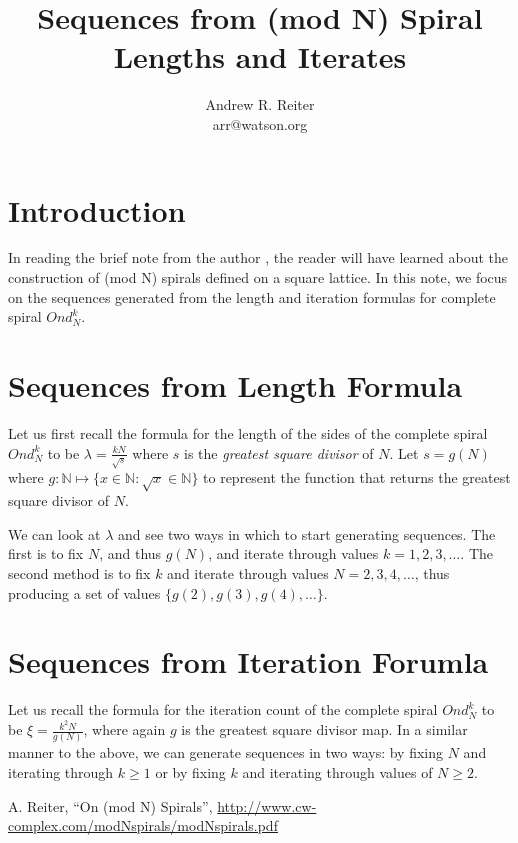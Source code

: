 \documentclass[11pt]{amsart}
\title{Sequences from (mod N) Spiral Lengths and Iterates}
\author{Andrew R. Reiter\\arr@watson.org}
\begin{document}
\maketitle

\section{Introduction}
In reading the brief note from the author \cite{ARRmodN}, the reader will have learned about the construction of (mod N) spirals defined on a square lattice. In this note, we focus on the sequences generated from the length and iteration formulas for complete spiral $Ond^k_N$.

\section{Sequences from Length Formula}
Let us first recall the formula for the length of the sides of the complete spiral $Ond^k_N$ to be $\lambda = \frac{kN}{\sqrt{s}}$ where $s$ is the \textit{greatest square divisor} of $N$. Let $s = g(N)$ where $g : \mathbb{N} \mapsto \{ x \in \mathbb{N} : \sqrt{x} \in \mathbb{N} \}$ to represent the function that returns the greatest square divisor of $N$.

We can look at $\lambda$ and see two ways in which to start generating sequences. The first is to fix $N$, and thus $g(N)$, and iterate through values $k=1, 2, 3, \ldots$. The second method is to fix $k$ and iterate through values $N=2, 3, 4, \ldots$, thus producing a set of values $\{ g(2), g(3), g(4), \ldots \}$.


\section{Sequences from Iteration Forumla}
Let us recall the formula for the iteration count of the complete spiral $Ond^k_N$ to be $\xi = \frac{k^2N}{g(N)}$, where again $g$ is the greatest square divisor map. In a similar manner to the above, we can generate sequences in two ways: by fixing $N$ and iterating through $k \ge 1$ or by fixing $k$ and iterating through values of $N \ge 2$.

\begin{thebibliography}{1}
 A. Reiter, ``On (mod N) Spirals'', \url{http://www.cw-complex.com/modNspirals/modNspirals.pdf}
\end{thebibliography}
\end{document}
